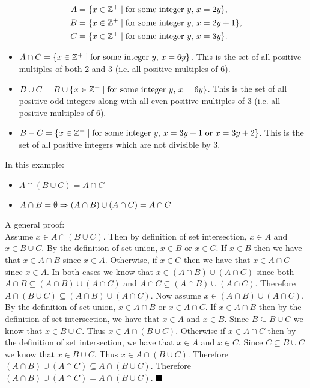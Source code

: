 \documentclass[11pt]{book}
\begin{document}
\begin{enumerate}
\begin{align*}
A &= \set{x \in \mathbb{Z^+} \mid \text{for some integer } y,\, x = 2y},\\
B &= \set{x \in \mathbb{Z^+} \mid \text{for some integer } y,\, x = 2y + 1},\\
C &= \set{x \in \mathbb{Z^+} \mid \text{for some integer } y,\, x = 3y}.
\end{align*}
	\begin{enumerate}
	{\begin{itemize}
		\item $A \cap C = \set{x \in \mathbb{Z^+} \mid \text{for some integer } y,\, x = 6y}$. This is the set of all positive multiples of both 2 and 3 (i.e. all positive multiples of 6).
		\item $B \cup C = B \cup \set{x \in \mathbb{Z^+} \mid \text{for some integer } y,\, x = 6y}$. This is the set of all positive odd integers along with all even positive multiples of 3 (i.e. all positive multiples of 6).
		\item $B - C = \set{x \in \mathbb{Z^+} \mid \text{for some integer } y,\, x = 3y + 1 \text{ or } x = 3y + 2}$. This is the set of all positive integers which are not divisible by 3.
	 \end{itemize}}
	{In this example:
	\begin{itemize}
		\item $A \cap (B \cup C) = A \cap C$
		\item $A \cap B = \emptyset \then (A \cap B) \cup (A \cap C) = A \cap C$
	\end{itemize}
	A general proof:\\
	Assume $x \in A \cap (B \cup C)$. Then by definition of set intersection, $x \in A$ and $x \in B \cup C$. By the definition of set union, $x \in B$ or $x \in C$. If $x \in B$ then we have that $x \in A \cap B$ since $x \in A$. Otherwise, if $x \in C$ then we have that $x \in A \cap C$ since $x \in A$. In both cases we know that $x \in (A \cap B) \cup (A \cap C)$ since both $A \cap B \subseteq (A \cap B) \cup (A \cap C)$ and $A \cap C \subseteq (A \cap B) \cup (A \cap C)$. Therefore $A \cap (B \cup C) \subseteq (A \cap B) \cup (A \cap C)$. Now assume $x \in (A \cap B) \cup (A \cap C)$. By the definition of set union, $x \in A \cap B$ or $x \in A \cap C$. If $x \in A \cap B$ then by the definition of set intersection, we have that $x \in A$ and $x \in B$. Since $B \subseteq B \cup C$ we know that $x \in B \cup C$. Thus $x \in A \cap (B \cup C)$. Otherwise if $x \in A \cap C$ then by the definition of set intersection, we have that $x \in A$ and $x \in C$. Since $C \subseteq B \cup C$ we know that $x \in B \cup C$. Thus $x \in A \cap (B \cup C)$. Therefore $(A \cap B) \cup (A \cap C) \subseteq  A \cap (B \cup C)$. Therefore $(A \cap B) \cup (A \cap C) =  A \cap (B \cup C)$. $\qed$}

\end{enumerate}
\end{enumerate}
\end{document}
